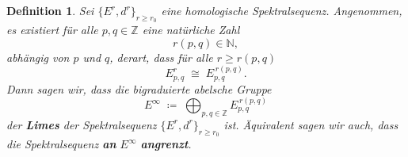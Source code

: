 \documentclass[12pt]{article}
\numberwithin{conj}{section}
\newtheorem{definition}[conj]{Definition}
\newcommand{\Z}{\mathbb{Z}}
\begin{document}
    \begin{definition}
        Sei $\{E^{r}, d^{r}\}_{r \geq r_0}$ eine homologische Spektralsequenz.
        Angenommen, es existiert für alle $p,q \in \Z$ eine natürliche Zahl
        \[
            r(p,q) \in \mathbb{N},
        \]
        abhängig von $p$ und $q$, derart, dass für alle $r \ge r(p,q)$
        \[
            E^{r}_{p,q}\;\cong\; E_{p,q}^{\,r(p,q)}.
        \]
        Dann sagen wir, dass die bigraduierte abelsche Gruppe
        \[
            E^{\infty} \;\coloneqq\; \bigoplus_{p,q \in \Z}E_{p,q}^{\,r(p,q)}
        \]
        der \textbf{Limes} der Spektralsequenz $\{E^{r}, d^{r}\}_{r \geq r_0}$ ist.
        Äquivalent sagen wir auch, dass die Spektralsequenz \textbf{an} $E^{\infty}$
        \textbf{angrenzt}.
    \end{definition}
\end{document}
